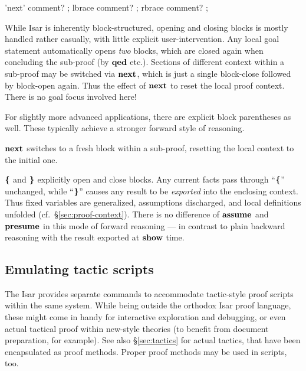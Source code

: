 
\begin{rail}
  'next' comment?
  ;
  lbrace comment?
  ;
  rbrace comment?
  ;
\end{rail}

While Isar is inherently block-structured, opening and closing blocks is
mostly handled rather casually, with little explicit user-intervention.  Any
local goal statement automatically opens \emph{two} blocks, which are closed
again when concluding the sub-proof (by ${\mathord{\mathbf{qed}}}$ etc.).  Sections of
different context within a sub-proof may be switched via ${\mathord{\mathbf{next}}}$, which is
just a single block-close followed by block-open again.  Thus the effect of
${\mathord{\mathbf{next}}}$ to reset the local proof context. There is no goal focus involved
here!

For slightly more advanced applications, there are explicit block parentheses
as well.  These typically achieve a stronger forward style of reasoning.

\begin{descr}
\item [${\mathord{\mathbf{next}}}$] switches to a fresh block within a sub-proof, resetting the
  local context to the initial one.
\item [${\mathord{\mathbf{\textbf{\{}}}}$ and ${\mathord{\mathbf{\textbf{\}}}}}$] explicitly open and close blocks.  Any current facts
  pass through ``${\mathord{\mathbf{\textbf{\{}}}}$'' unchanged, while ``${\mathord{\mathbf{\textbf{\}}}}}$'' causes any result to be
  \emph{exported} into the enclosing context.  Thus fixed variables are
  generalized, assumptions discharged, and local definitions unfolded (cf.\ 
  \S\ref{sec:proof-context}).  There is no difference of ${\mathord{\mathbf{assume}}}$ and
  ${\mathord{\mathbf{presume}}}$ in this mode of forward reasoning --- in contrast to plain
  backward reasoning with the result exported at ${\mathord{\mathbf{show}}}$ time.
\end{descr}


\subsection{Emulating tactic scripts}\label{sec:tactic-commands}

The Isar provides separate commands to accommodate tactic-style proof scripts
within the same system.  While being outside the orthodox Isar proof language,
these might come in handy for interactive exploration and debugging, or even
actual tactical proof within new-style theories (to benefit from document
preparation, for example).  See also \S\ref{sec:tactics} for actual tactics,
that have been encapsulated as proof methods.  Proper proof methods may be
used in scripts, too.

